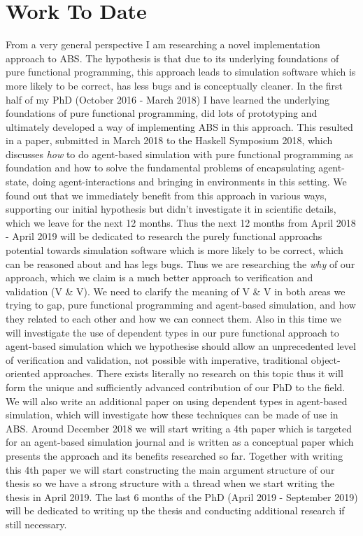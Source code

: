\chapter{Work To Date}
\label{chap:work}

From a very general perspective I am researching a novel implementation approach to ABS. The hypothesis is that due to its underlying foundations of pure functional programming, this approach leads to simulation software which is more likely to be correct, has less bugs and is conceptually cleaner.
In the first half of my PhD (October 2016 - March 2018) I have learned the underlying foundations of pure functional programming, did lots of prototyping and ultimately developed a way of implementing ABS in this approach. This resulted in a paper, submitted in March 2018 to the Haskell Symposium 2018, which discusses \textit{how} to do agent-based simulation with pure functional programming as foundation and how to solve the fundamental problems of encapsulating agent-state, doing agent-interactions and bringing in environments in this setting.
We found out that we immediately benefit from this approach in various ways, supporting our initial hypothesis but didn't investigate it in scientific details, which we leave for the next 12 months. Thus the next 12 months from April 2018 - April 2019 will be dedicated to research the purely functional approachs potential towards simulation software which is more likely to be correct, which can be reasoned about and has legs bugs. Thus we are researching the \textit{why} of our approach, which we claim is a much better approach to verification and validation (V \& V). We need to clarify the meaning of V \& V in both areas we trying to gap, pure functional programming and agent-based simulation, and how they related to each other and how we can connect them.
Also in this time we will investigate the use of dependent types in our pure functional approach to agent-based simulation which we hypothesise should allow an unprecedented level of verification and validation, not possible with imperative, traditional object-oriented approaches. There exists literally no research on this topic thus it will form the unique and sufficiently advanced contribution of our PhD to the field. We will also write an additional paper on using dependent types in agent-based simulation, which will investigate how these techniques can be made of use in ABS.
Around December 2018 we will start writing a 4th paper which is targeted for an agent-based simulation journal and is written as a conceptual paper which presents the approach and its benefits researched so far. Together with writing this 4th paper we will start constructing the main argument structure of our thesis so we have a strong structure with a thread when we start writing the thesis in April 2019. The last 6 months of the PhD (April 2019 - September 2019) will be dedicated to writing up the thesis and conducting additional research if still necessary.


